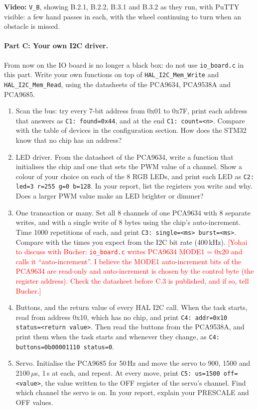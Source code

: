 \documentclass[11pt,a4paper]{article}
\newcommand{\flag}[1]{\textcolor{red}{[#1]}}
\begin{document}
\noindent\textbf{Video:} \texttt{V\_B}, showing B.2.1, B.2.2, B.3.1 and B.3.2 as they run, with PuTTY visible: a few
hand passes in each, with the wheel continuing to turn when an obstacle is missed.

\paragraph{Part C: Your own I2C driver.}
From now on the IO board is no longer a black box: do not use \texttt{io\_board.c} in this part. Write your own
functions on top of \texttt{HAL\_I2C\_Mem\_Write} and \texttt{HAL\_I2C\_Mem\_Read}, using the datasheets of the
PCA9634, PCA9538A and PCA9685.
\begin{enumerate}[label=C.\arabic*, leftmargin=2.2em]
  \item Scan the bus: try every 7-bit address from 0x01 to 0x7F, print each address that answers as
        \texttt{C1: found=0x44}, and at the end \texttt{C1: count=<n>}. Compare with the table of devices in the
        configuration section. How does the STM32 know that no chip has an address?
  \item LED driver. From the datasheet of the PCA9634, write a function that initialises the chip and one that sets
        the PWM value of a channel. Show a colour of your choice on each of the 8 RGB LEDs, and print each LED as
        \texttt{C2: led=3 r=255 g=0 b=128}. In your report, list the registers you write and why. Does a larger
        PWM value make an LED brighter or dimmer?
  \item One transaction or many. Set all 8 channels of one PCA9634 with 8 separate writes, and with a single write of
        8 bytes using the chip's auto-increment. Time 1000 repetitions of each, and print
        \texttt{C3: single=<ms> burst=<ms>}. Compare with the times you expect from the I2C bit rate (400\,kHz).
        \flag{Yohai to discuss with Bucher: \texttt{io\_board.c} writes PCA9634 MODE1 = 0x20 and calls it
        ``auto-increment''. I believe the MODE1 auto-increment bits of the PCA9634 are read-only and auto-increment is
        chosen by the control byte (the register address). Check the datasheet before C.3 is published, and if so,
        tell Bucher.}
  \item Buttons, and the return value of every HAL I2C call. When the task starts, read from address 0x10, which has
        no chip, and print \texttt{C4: addr=0x10 status=<return value>}. Then read the buttons from the PCA9538A, and
        print them when the task starts and whenever they change, as \texttt{C4: buttons=0b00001110 status=0}.
  \item Servo. Initialise the PCA9685 for 50\,Hz and move the servo to 900, 1500 and 2100\,$\mu$s, 1\,s at each, and
        repeat. At every move, print \texttt{C5: us=1500 off=<value>}, the value written to the OFF register of the
        servo's channel. Find which channel the servo is on. In your report, explain your PRESCALE and OFF values.
\end{enumerate}
\end{document}
